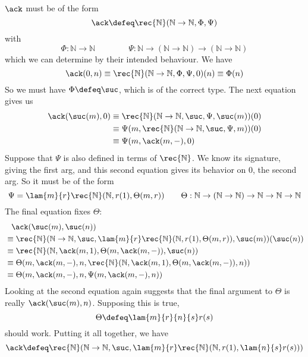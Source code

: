 \soln 
$\ack$ must be of the form
\[
  \ack \defeq 
  \rec{\mathbb{N}}(\mathbb{N} \to \mathbb{N}, \Phi, \Psi)
\]
with
\[
  \Phi : \mathbb{N} \to \mathbb{N}
  \qquad\qquad
  \Psi : \mathbb{N} \to (\mathbb{N} \to \mathbb{N}) \to (\mathbb{N} \to
  \mathbb{N})
\]
which we can determine by their intended behaviour.  We have
\[
  \ack(0, n)
  \equiv
  \rec{\mathbb{N}}(\mathbb{N} \to \mathbb{N}, \Phi, \Psi, 0)(n)
  \equiv
  \Phi(n)
\]
So we must have $\Phi \defeq \suc$, which is of the correct type.  The next
equation gives us
\begin{align*}
  \ack(\suc(m), 0)
  &\equiv
  \rec{\mathbb{N}}(\mathbb{N} \to \mathbb{N}, \suc, \Psi, \suc(m))(0)
  \\&\equiv
  \Psi(m, \rec{\mathbb{N}}(\mathbb{N} \to \mathbb{N}, \suc, \Psi, m))(0)
  \\&\equiv
  \Psi(m, \ack(m, -), 0)
\end{align*}
Suppose that $\Psi$ is also defined in terms of $\rec{\mathbb{N}}$.  We know
its signature, giving the first arg, and this second equation gives its
behavior on $0$, the second arg.  So it must be of the form
\[
  \Psi = 
  \lam{m}{r} \rec{\mathbb{N}}(\mathbb{N}, r(1), \Theta(m, r))
  \qquad
  \Theta : \mathbb{N} \to (\mathbb{N} \to \mathbb{N}) \to \mathbb{N} \to \mathbb{N} \to \mathbb{N}
\]
The final equation fixes $\Theta$:
\begin{align*}
  &\phantom{\equiv} \ack(\suc(m), \suc(n))
  \\&\equiv
  \rec{\mathbb{N}}(\mathbb{N} \to \mathbb{N}, \suc, 
  \lam{m}{r} \rec{\mathbb{N}}(\mathbb{N}, r(1), \Theta(m, r)),
  \suc(m))(\suc(n))
  \\&\equiv
  \rec{\mathbb{N}}(\mathbb{N}, \ack(m, 1), \Theta(m, \ack(m, -)), \suc(n))
  \\&\equiv
  \Theta(m, \ack(m, -), n, 
  \rec{\mathbb{N}}(\mathbb{N}, \ack(m, 1), \Theta(m, \ack(m, -)), n)
  )
  \\&\equiv
  \Theta(m, \ack(m, -), n, 
  \Psi(m, \ack(m, -), n)
  )
\end{align*}
Looking at the second equation again suggests that the final argument to
$\Theta$ is really $\ack(\suc(m), n)$.  Supposing this is true,
\[
    \Theta \defeq \lam{m}{r}{n}{s}r(s)
\]
should work.  Putting it all together, we have
\[
  \ack \defeq 
  \rec{\mathbb{N}}(\mathbb{N} \to \mathbb{N}, 
  \suc,
  \lam{m}{r}\rec{\mathbb{N}}(\mathbb{N}, 
                             r(1), 
                             \lam{n}{s}r(s))
  )
\]
